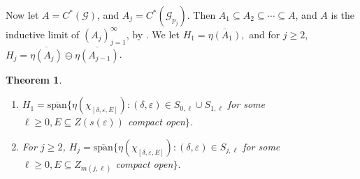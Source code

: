 \documentclass[12pt]{amsart}
\newcommand{\sse}{\subseteq}
\newcommand{\spn}{\text{span}}
\newcommand{\cspn}{\overline{\spn}}
\newcommand{\mc}[1]{\mathcal{#1}}
\newcommand{\de}{\delta}
\newcommand{\ep}{\varepsilon}
\theoremstyle{plain} %
\newtheorem{Theorem}{Theorem}[section]
\theoremstyle{definition} %
\begin{document}
Now let $A = C^*(\mc{G})$, and  $A_j = C^*(\mc{G}_{p_j})$. Then $A_1 \sse A_2 \sse \cdots \sse A$, and $A$ is the inductive limit of $(A_j)_{j=1}^{\infty}$, by \cite[Theorem 5.1]{MS22}.
We let $H_1 = \overline{\eta(A_{1})},$ and for $j \ge 2$, $H_j = \overline{\eta(A_{j})} \ominus \overline{\eta(A_{j -1})}$.

\begin{Theorem}\label{thm H_j} ~
\begin{enumerate}
    \item\label{thm H_j 1} $H_1 = \cspn\{ \eta(\chi_{[\de, \ep, E]}) : (\de, \ep) \in S_{0,\ell} \cup S_{1, \ell}$ for some $\ell \ge 0, E \sse Z(s(\ep))$ compact open$\}$.

    \item\label{thm H_j 2} For $j \ge 2$,
    $H_j = \cspn\{\eta(\chi_{[\de, \ep, E]}) : (\de, \ep) \in S_{j,\ell}$ for some $\ell \ge 0, E \sse Z_{m(j,\ell)} $ compact open$\}.$
\end{enumerate}
\end{Theorem}
\end{document}
